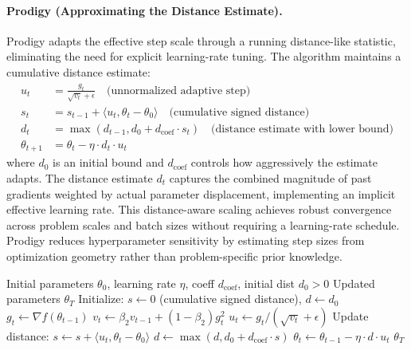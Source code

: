\documentclass[11pt,a4paper]{article}
\begin{document}
\paragraph{Prodigy (Approximating the Distance Estimate).}
Prodigy adapts the effective step scale through a running distance-like statistic, eliminating the need for explicit learning-rate tuning. The algorithm maintains a cumulative distance estimate:
\begin{align}
u_t &= \frac{g_t}{\sqrt{v_t}+\epsilon} \quad\text{(unnormalized adaptive step)} \\
s_t &= s_{t-1} + \langle u_t, \theta_t - \theta_0 \rangle \quad\text{(cumulative signed distance)} \\
d_t &= \max(d_{t-1}, d_0 + d_{\text{coef}} \cdot s_t) \quad\text{(distance estimate with lower bound)} \\
\theta_{t+1} &= \theta_t - \eta \cdot d_t \cdot u_t
\end{align}
where $d_0$ is an initial bound and $d_{\text{coef}}$ controls how aggressively the estimate adapts. The distance estimate $d_t$ captures the combined magnitude of past gradients weighted by actual parameter displacement, implementing an implicit effective learning rate. This distance-aware scaling achieves robust convergence across problem scales and batch sizes without requiring a learning-rate schedule. Prodigy reduces hyperparameter sensitivity by estimating step sizes from optimization geometry rather than problem-specific prior knowledge.

\begin{algorithm}[H]
\caption{Prodigy (Approximating the Distance Estimate)}
\label{alg:prodigy}
\begin{algorithmic}[1]
\Require Initial parameters $\theta_0$, learning rate $\eta$, coeff $d_{\text{coef}}$, initial dist $d_0 > 0$
\Ensure Updated parameters $\theta_T$
\State Initialize: $s \gets 0$ (cumulative signed distance), $d \gets d_0$
    \State $g_t \gets \nabla f(\theta_{t-1})$
    \State $v_t \gets \beta_2 v_{t-1} + (1-\beta_2) g_t^2$ 
    \State $u_t \gets g_t / (\sqrt{v_t} + \epsilon)$ 
    \State Update distance: $s \gets s + \langle u_t, \theta_t - \theta_0 \rangle$ 
    \State $d \gets \max(d, d_0 + d_{\text{coef}} \cdot s)$ 
    \State $\theta_t \gets \theta_{t-1} - \eta \cdot d \cdot u_t$ 
\EndFor
\Return $\theta_T$
\end{algorithmic}
\end{algorithm}
\end{document}
